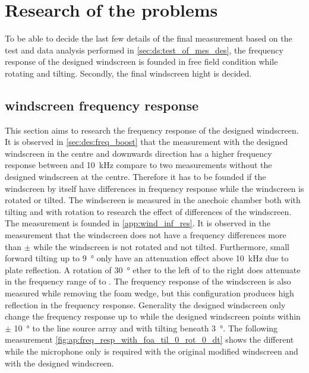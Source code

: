 
      
            
\section{Research of the problems}
To be able to decide the last few details of the final measurement based on the test and data analysis performed in \autoref{sec:ds:test_of_mes_des}, the frequency response of the designed windscreen is founded in free field condition while rotating and tilting. Secondly, the final windscreen hight is decided.

\subsection{windscreen frequency response}\label{sec:ds:wind_freq_res}
This section aims to research the frequency response of the designed windscreen. It is observed in \autoref{sec:des:freq_boost} that the measurement with the designed windscreen in the centre and downwards direction has a higher frequency response between  and \SI{10}{\kilo\hertz} compare to two measurements without the designed windscreen at the centre. Therefore it has to be founded if the windscreen by itself have differences in frequency response while the windscreen is rotated or tilted. The windscreen is measured in the anechoic chamber both with tilting and with rotation to research the effect of differences of the windscreen. The measurement is founded in \autoref{app:wind_inf_res}. It is observed in the measurement that the windscreen does not have a frequency differences more than $\pm$ while the windscreen is not rotated and not tilted. Furthermore, small forward tilting up to \SI{9}{\degree} only have an attenuation effect above \SI{10}{\kilo\hertz} due to plate reflection. A rotation of \SI{30}{\degree} ether to the left of to the right does attenuate in the frequency range of  to . The frequency response of the windscreen is also measured while removing the foam wedge, but this configuration produces high reflection in the frequency response. Generality the designed windscreen only change the frequency response up to  while the designed windscreen points within $\pm$ \SI{10}{\degree} to the line source array and with tilting beneath \SI{3}{\degree}. The following measurement \autoref{fig:ap:freq_resp_with_foa_til_0_rot_0_dt} shows the different while the microphone only is required with the original modified windscreen and with the designed windscreen.



